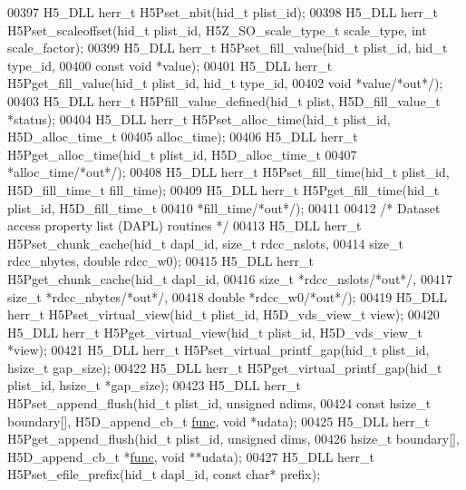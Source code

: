 \begin{DoxyCode}
00397 H5\_DLL herr\_t H5Pset\_nbit(hid\_t plist\_id);
00398 H5\_DLL herr\_t H5Pset\_scaleoffset(hid\_t plist\_id, H5Z\_SO\_scale\_type\_t scale\_type, \textcolor{keywordtype}{int} scale\_factor);
00399 H5\_DLL herr\_t H5Pset\_fill\_value(hid\_t plist\_id, hid\_t type\_id,
00400      \textcolor{keyword}{const} \textcolor{keywordtype}{void} *value);
00401 H5\_DLL herr\_t H5Pget\_fill\_value(hid\_t plist\_id, hid\_t type\_id,
00402      \textcolor{keywordtype}{void} *value\textcolor{comment}{/*out*/});
00403 H5\_DLL herr\_t H5Pfill\_value\_defined(hid\_t plist, H5D\_fill\_value\_t *status);
00404 H5\_DLL herr\_t H5Pset\_alloc\_time(hid\_t plist\_id, H5D\_alloc\_time\_t
00405     alloc\_time);
00406 H5\_DLL herr\_t H5Pget\_alloc\_time(hid\_t plist\_id, H5D\_alloc\_time\_t
00407     *alloc\_time\textcolor{comment}{/*out*/});
00408 H5\_DLL herr\_t H5Pset\_fill\_time(hid\_t plist\_id, H5D\_fill\_time\_t fill\_time);
00409 H5\_DLL herr\_t H5Pget\_fill\_time(hid\_t plist\_id, H5D\_fill\_time\_t
00410     *fill\_time\textcolor{comment}{/*out*/});
00411 
00412 \textcolor{comment}{/* Dataset access property list (DAPL) routines */}
00413 H5\_DLL herr\_t H5Pset\_chunk\_cache(hid\_t dapl\_id, \textcolor{keywordtype}{size\_t} rdcc\_nslots,
00414        \textcolor{keywordtype}{size\_t} rdcc\_nbytes, \textcolor{keywordtype}{double} rdcc\_w0);
00415 H5\_DLL herr\_t H5Pget\_chunk\_cache(hid\_t dapl\_id,
00416        \textcolor{keywordtype}{size\_t} *rdcc\_nslots\textcolor{comment}{/*out*/},
00417        \textcolor{keywordtype}{size\_t} *rdcc\_nbytes\textcolor{comment}{/*out*/},
00418        \textcolor{keywordtype}{double} *rdcc\_w0\textcolor{comment}{/*out*/});
00419 H5\_DLL herr\_t H5Pset\_virtual\_view(hid\_t plist\_id, H5D\_vds\_view\_t view);
00420 H5\_DLL herr\_t H5Pget\_virtual\_view(hid\_t plist\_id, H5D\_vds\_view\_t *view);
00421 H5\_DLL herr\_t H5Pset\_virtual\_printf\_gap(hid\_t plist\_id, hsize\_t gap\_size);
00422 H5\_DLL herr\_t H5Pget\_virtual\_printf\_gap(hid\_t plist\_id, hsize\_t *gap\_size);
00423 H5\_DLL herr\_t H5Pset\_append\_flush(hid\_t plist\_id, \textcolor{keywordtype}{unsigned} ndims,
00424     \textcolor{keyword}{const} hsize\_t boundary[], H5D\_append\_cb\_t \hyperlink{structfunc}{func}, \textcolor{keywordtype}{void} *udata);
00425 H5\_DLL herr\_t H5Pget\_append\_flush(hid\_t plist\_id, \textcolor{keywordtype}{unsigned} dims,
00426     hsize\_t boundary[], H5D\_append\_cb\_t *\hyperlink{structfunc}{func}, \textcolor{keywordtype}{void} **udata);
00427 H5\_DLL herr\_t H5Pset\_efile\_prefix(hid\_t dapl\_id, \textcolor{keyword}{const} \textcolor{keywordtype}{char}* prefix);

\end{DoxyCode}
